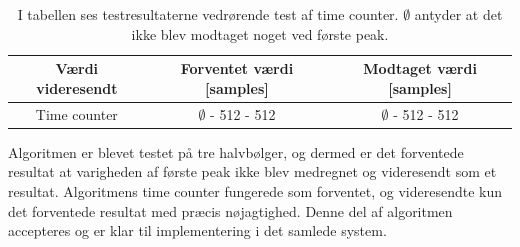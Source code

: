 \begin{table}[H]
	\centering
	\begin{tabular}{ccc}
		\hline
		\rowcolor[HTML]{C0C0C0} 
		Værdi videresendt & Forventet værdi [samples] & Modtaget værdi [samples] \\ \hline
		Time counter & $\emptyset$ - 512 - 512 & $\emptyset$ - 512 - 512 \\ \hline
	\end{tabular}
	\caption{I tabellen ses testresultaterne vedrørende test af time counter. $\emptyset$ antyder at det ikke blev modtaget noget ved første peak.}
	\label{tab:test_res_timecount}
\end{table} \vspace{-0.5cm}
Algoritmen er blevet testet på tre halvbølger, og dermed er det forventede resultat at varigheden af første peak ikke blev medregnet og videresendt som et resultat. Algoritmens time counter fungerede som forventet, og videresendte kun det forventede resultat med præcis nøjagtighed. Denne del af algoritmen accepteres og er klar til implementering i det samlede system.


